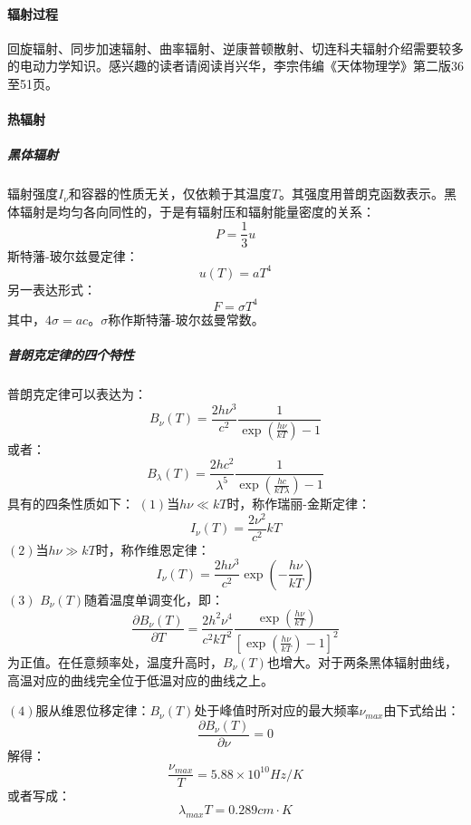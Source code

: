 \paragraph{辐射过程}
回旋辐射、同步加速辐射、曲率辐射、逆康普顿散射、切连科夫辐射介绍需要较多的电动力学知识。感兴趣的读者请阅读肖兴华，李宗伟编《天体物理学》第二版36至51页。
\paragraph{热辐射}
\subparagraph{黑体辐射}
辐射强度$I_{\nu}$和容器的性质无关，仅依赖于其温度$T$。其强度用普朗克函数表示。黑体辐射是均匀各向同性的，于是有辐射压和辐射能量密度的关系：
\begin{equation}
	P=\frac{1}{3}u
\end{equation}
斯特藩-玻尔兹曼定律：
\begin{equation}
	u(T)=aT^4
\end{equation}
另一表达形式：
\begin{equation}
	F=\sigma T^4
\end{equation}
其中，$4\sigma=ac$。$\sigma$称作斯特藩-玻尔兹曼常数。
\subparagraph{普朗克定律的四个特性}
普朗克定律可以表达为：
\begin{equation}
	B_{\nu}(T)=\frac{2h\nu^3}{c^2}\frac{1}{\exp(\frac{h\nu}{kT})-1}
\end{equation}
或者：
\begin{equation}
	B_{\lambda}(T)=\frac{2hc^2}{\lambda^5}\frac{1}{\exp(\frac{hc}{kT\lambda})-1}
\end{equation}
具有的四条性质如下：
$\left(1\right)$当$h\nu\ll kT$时，称作瑞丽-金斯定律：
\begin{equation}
	I_{\nu}(T)=\frac{2\nu^2}{c^2}kT
\end{equation}
$\left(2\right)$当$h\nu\gg kT$时，称作维恩定律：
\begin{equation}
	I_{\nu}(T)=\frac{2h\nu^3}{c^2}\exp(-\frac{h\nu}{kT})
\end{equation}
$\left(3\right)$ $B_{\nu}(T)$随着温度单调变化，即：
\begin{equation}
	\frac{\partial B_{\nu}(T)}{\partial T}=\frac{2h^2\nu^4}{c^2kT^2}\frac{\exp(\frac{h\nu}{kT})}{\left[\exp(\frac{h\nu}{kT})-1\right]^2}
\end{equation}
为正值。在任意频率处，温度升高时，$B_{\nu}(T)$也增大。对于两条黑体辐射曲线，高温对应的曲线完全位于低温对应的曲线之上。

\noindent $\left(4\right)$服从维恩位移定律：$B_{\nu}(T)$处于峰值时所对应的最大频率$\nu_{max}$由下式给出：
\begin{equation}
	\frac{\partial B_{\nu}(T)}{\partial \nu}=0
\end{equation}
解得：
\begin{equation}
	\frac{\nu_{max}}{T}=5.88\times10^{10}Hz/K
\end{equation}
或者写成：
\begin{equation}
	\lambda_{max}T=0.289cm\cdot K
\end{equation}

